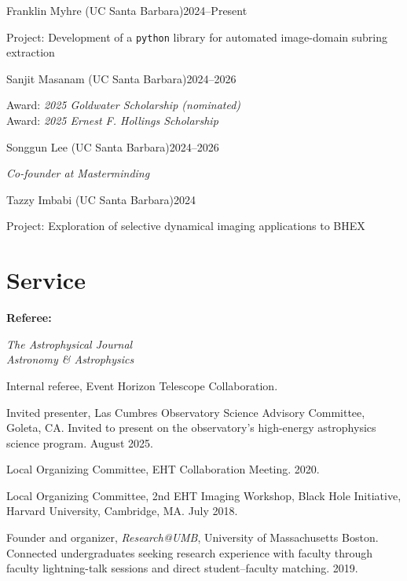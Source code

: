 \documentclass[margin,line]{res}
\newcommand{\mentee}[3]{%
  {\leftskip=5mm \noindent #1\hfill #2\par}%
  {\leftskip=11mm \noindent #3\par}%
  \vspace{1.5mm}}
\begin{document}
\begin{resume}
{\mentee{Franklin Myhre (UC Santa Barbara)}{2024--Present}
  {Project: Development of a \texttt{python} library for automated image-domain subring extraction}
 
\mentee{Sanjit Masanam (UC Santa Barbara)}{2024--2026}
  {Award: \textit{2025 Goldwater Scholarship (nominated)} \\
   Award: \textit{2025 Ernest F. Hollings Scholarship}}
 
\mentee{Songgun Lee (UC Santa Barbara)}{2024--2026}
  {\textit{Co-founder at Masterminding}}
 
\mentee{Tazzy Imbabi (UC Santa Barbara)}{2024}
  {Project: Exploration of selective dynamical imaging applications to BHEX}
 
}


\section{\sc Service}

{\bf Referee:}\par
\vspace{-0.4cm}
{\leftskip=3mm \noindent
\textit{The Astrophysical Journal} \\
\textit{Astronomy \& Astrophysics}\par}

\vspace*{-2mm}
Internal referee, Event Horizon Telescope Collaboration.

\vspace*{-2mm}
Invited presenter, Las Cumbres Observatory Science Advisory Committee, Goleta, CA. Invited to present on the observatory's high-energy astrophysics science program. August 2025.

\vspace*{-2mm}
Local Organizing Committee, EHT Collaboration Meeting. 2020.

\vspace*{-2mm}
Local Organizing Committee, 2nd EHT Imaging Workshop, Black Hole Initiative, Harvard University, Cambridge, MA. July 2018.

\vspace*{-2mm}
Founder and organizer, \textit{Research@UMB}, University of Massachusetts Boston. Connected undergraduates seeking research experience with faculty through faculty lightning-talk sessions and direct student--faculty matching. 2019. %


\vspace{+.2cm}

\end{resume}
\end{document}
